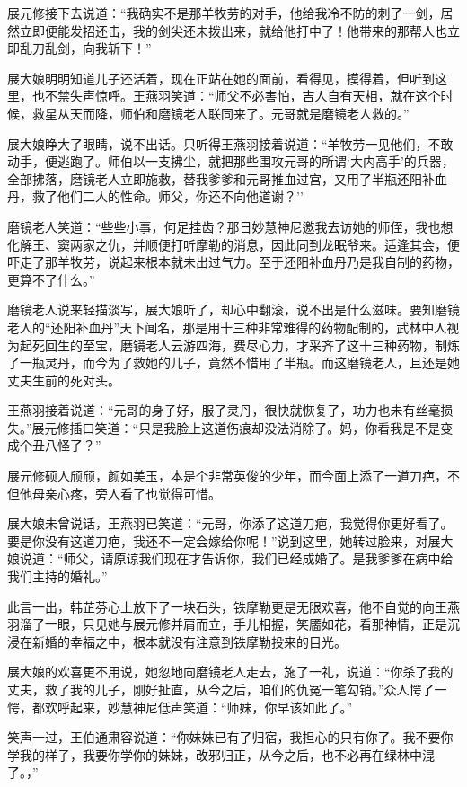 \documentclass[12pt,oneside]{book}
\begin{document}
展元修接下去说道：``我确实不是那羊牧劳的对手，他给我冷不防的刺了一剑，居然立即便能发招还击，我的剑尖还未拨出来，就给他打中了！他带来的那帮人也立即乱刀乱剑，向我斩下！''

展大娘明明知道儿子还活着，现在正站在她的面前，看得见，摸得着，但听到这里，也不禁失声惊呼。王燕羽笑道：``师父不必害怕，吉人自有天相，就在这个时候，救星从天而降，师伯和磨镜老人联同来了。元哥就是磨镜老人救的。''

展大娘睁大了眼睛，说不出话。只听得王燕羽接着说道：``羊牧劳一见他们，不敢动手，便逃跑了。师伯以一支拂尘，就把那些围攻元哥的所谓`大内高手'的兵器，全部拂落，磨镜老人立即施救，替我爹爹和元哥推血过宫，又用了半瓶还阳补血丹，救了他们二人的性命。师父，你还不向他道谢？''

磨镜老人笑道：``些些小事，何足挂齿？那日妙慧神尼邀我去访她的师侄，我也想化解王、窦两家之仇，并顺便打听摩勒的消息，因此同到龙眠爷来。适逢其会，便吓走了那羊牧劳，说起来根本就未出过气力。至于还阳补血丹乃是我自制的药物，更算不了什么。''

磨镜老人说来轻描淡写，展大娘听了，却心中翻滚，说不出是什么滋味。要知磨镜老人的``还阳补血丹''天下闻名，那是用十三种非常难得的药物配制的，武林中人视为起死回生的至宝，磨镜老人云游四海，费尽心力，才采齐了这十三种药物，制炼了一瓶灵丹，而今为了救她的儿子，竟然不惜用了半瓶。而这磨镜老人，且还是她丈夫生前的死对头。

王燕羽接着说道：``元哥的身子好，服了灵丹，很快就恢复了，功力也未有丝毫损失。''展元修插口笑道：``只是我脸上这道伤痕却没法消除了。妈，你看我是不是变成个丑八怪了？''

展元修硕人颀颀，颜如美玉，本是个非常英俊的少年，而今面上添了一道刀疤，不但他母亲心疼，旁人看了也觉得可惜。

展大娘未曾说话，王燕羽已笑道：``元哥，你添了这道刀疤，我觉得你更好看了。要是你没有这道刀疤，我还不一定会嫁给你呢！''说到这里，她转过脸来，对展大娘说道：``师父，请原谅我们现在才告诉你，我们已经成婚了。是我爹爹在病中给我们主持的婚礼。''

此言一出，韩芷芬心上放下了一块石头，铁摩勒更是无限欢喜，他不自觉的向王燕羽溜了一眼，只见她与展元修并肩而立，手儿相握，笑靥如花，看那神情，正是沉浸在新婚的幸福之中，根本就没有注意到铁摩勒投来的目光。

展大娘的欢喜更不用说，她忽地向磨镜老人走去，施了一礼，说道：``你杀了我的丈夫，救了我的儿子，刚好扯直，从今之后，咱们的仇冤一笔勾销。''众人愕了一愕，都欢呼起来，妙慧神尼低声笑道：``师妹，你早该如此了。''

笑声一过，王伯通肃容说道：``你妹妹已有了归宿，我担心的只有你了。我不要你学我的样子，我要你学你的妹妹，改邪归正，从今之后，也不必再在绿林中混了。，''
\end{document}
